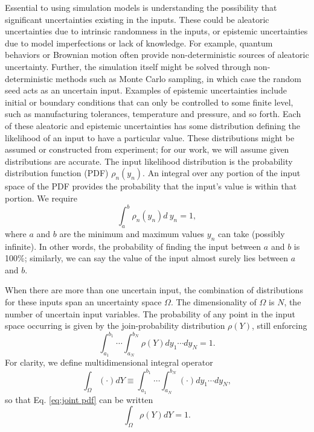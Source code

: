 Essential to using simulation models is understanding the possibility that significant uncertainties existing in
the inputs.  These could be aleatoric uncertainties due to intrinsic randomness in the inputs, or epistemic
uncertainties due to model imperfections or lack of knowledge.  
For example, quantum behaviors or Brownian motion often provide non-deterministic sources of aleatoric uncertainty.
Further, the simulation itself might be solved through non-deterministic methods such as Monte Carlo sampling,
in which case the random seed acts as an uncertain input.  Examples of epistemic uncertainties include initial
or boundary conditions that can only be controlled to some finite level, such as manufacturing tolerances,
temperature and pressure, and so forth.
Each of these aleatoric and epistemic uncertainties has some
distribution defining the likelihood of an input to have a particular value.  These distributions might be
assumed or constructed from experiment; for our work, we will assume given distributions are accurate.  The
input likelihood distribution is the probability distribution function (PDF) $\rho_n(y_n)$.  
An integral over any portion of the input space of the PDF provides the probability that the input's value
is within that portion.
We require
\begin{equation}
  \int_a^b \rho_n(y_n) d\ y_n = 1,
\end{equation}
where $a$ and $b$ are the minimum and maximum values $y_n$ can take (possibly infinite).  In other words, the
probability of finding the input between $a$ and $b$ is 100\%; similarly, we can say the value of the input
almost surely lies between $a$ and $b$.

When there are more than one uncertain input, the combination of distributions for these inputs span an
uncertainty space $\Omega$. The dimensionality of $\Omega$ is $N$,
the number of uncertain input variables.  The probability of any point in the input space occurring is given
by the join-probability distribution $\rho(Y)$, still enforcing
\begin{equation} \label{eq:joint pdf}
  \int_{a_1}^{b_1}\cdots\int_{a_N}^{b_N} \rho(Y) dy_1\cdots dy_N = 1.
\end{equation}
For clarity, we define multidimensional integral operator
\begin{equation}
  \int_\Omega (\cdot)dY\equiv \int_{a_1}^{b_1}\cdots\int_{a_N}^{b_N} (\cdot) dy_1\cdots dy_N,
\end{equation}
so that Eq. \ref{eq:joint pdf} can be written
\begin{equation}
  \int_\Omega \rho(Y) dY = 1.
\end{equation}

